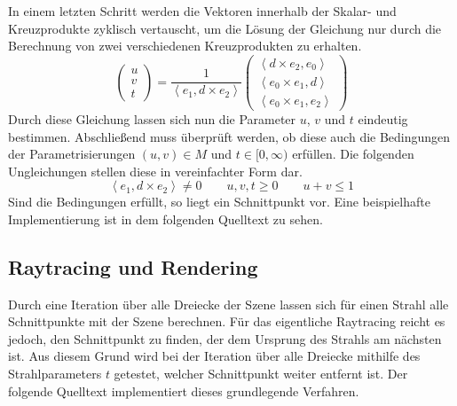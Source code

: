 \documentclass[crop=false]{standalone}
\begin{document}
      In einem letzten Schritt werden die Vektoren innerhalb der Skalar- und Kreuzprodukte zyklisch vertauscht, um die Lösung der Gleichung nur durch die Berechnung von zwei verschiedenen Kreuzprodukten zu erhalten.
      \[
        \begin{pmatrix}
          u \\
          v \\
          t
        \end{pmatrix}
        =
        \frac{1}{\left\langle e_1, d\times e_2  \right\rangle}
        \begin{pmatrix}
          \left\langle d\times e_2 , e_0 \right\rangle \\
          \left\langle e_0\times e_1 , d \right\rangle \\
          \left\langle e_0\times e_1, e_2 \right\rangle
        \end{pmatrix}
      \]
      Durch diese Gleichung lassen sich nun die Parameter $u$, $v$ und $t$ eindeutig bestimmen.
      Abschließend muss überprüft werden, ob diese auch die Bedingungen der Parametrisierungen $(u,v)\in M$ und $t\in [0,\infty)$ erfüllen.
      Die folgenden Ungleichungen stellen diese in vereinfachter Form dar.
      \[
        \left\langle e_1, d\times e_2  \right\rangle \neq 0
        \qquad
        u,v,t \geq 0
        \qquad
        u+v\leq 1
      \]
      Sind die Bedingungen erfüllt, so liegt ein Schnittpunkt vor.
      Eine beispielhafte Implementierung ist in dem folgenden Quelltext zu sehen.


    \subsection{Raytracing und Rendering} %
    \label{sub:raytracing_und_rendering}
      Durch eine Iteration über alle Dreiecke der Szene lassen sich für einen Strahl alle Schnittpunkte mit der Szene berechnen.
      Für das eigentliche Raytracing reicht es jedoch, den Schnittpunkt zu finden, der dem Ursprung des Strahls am nächsten ist.
      Aus diesem Grund wird bei der Iteration über alle Dreiecke mithilfe des Strahlparameters $t$ getestet, welcher Schnittpunkt weiter entfernt ist.
      Der folgende Quelltext implementiert dieses grundlegende Verfahren.

\end{document}
